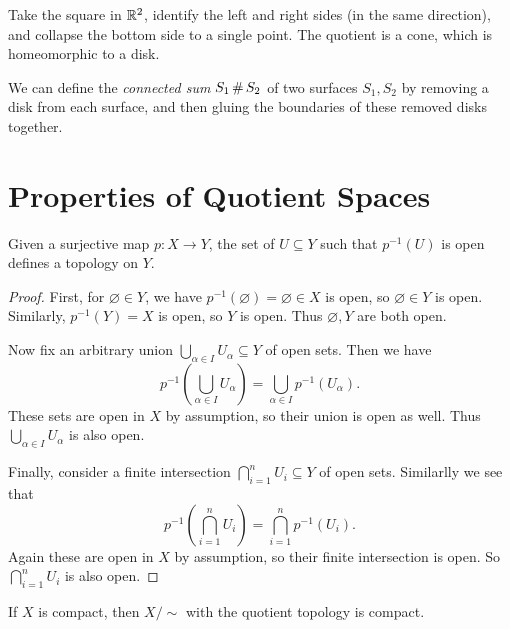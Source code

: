 \begin{example}[Cone]
  Take the square in $\mathbb{R}^2$, identify the left
  and right sides (in the same direction), and
  collapse the bottom side to a single point.
  The quotient is a cone, which is homeomorphic
  to a disk.
\end{example}

\begin{remark}
  We can define the \emph{connected sum} $S_1 \operatorname{\#} S_2$ of
  two surfaces $S_1, S_2$ by
  removing a disk from each surface, and then
  gluing the boundaries of these removed disks
  together.
\end{remark}

\section{Properties of Quotient Spaces}

\begin{theorem}
  Given a surjective map $p : X \to Y$,
  the set of $U \subseteq Y$ such that
  $p^{-1}(U)$ is open defines a topology on $Y$.
\end{theorem}

\begin{proof}
  First, for $\varnothing \in Y$, we have
  $p^{-1}(\varnothing) = \varnothing \in X$ is open,
  so $\varnothing \in Y$ is open. Similarly,
  $p^{-1}(Y) = X$ is open, so $Y$ is open.
  Thus $\varnothing, Y$ are both open.

  Now fix an arbitrary union $\bigcup_{\alpha \in I} U_{\alpha} \subseteq Y$ of open sets.
  Then we have
  \[
    p^{-1}\left(\bigcup_{\alpha \in I} U_{\alpha}\right)
    = \bigcup_{\alpha \in I} p^{-1}(U_{\alpha}).
  \]
  These sets are open in $X$ by assumption, so their
  union is open as well. Thus
  $\bigcup_{\alpha \in I} U_{\alpha}$ is also open.

  Finally, consider a finite intersection
  $\bigcap_{i = 1}^n U_i \subseteq Y$ of open sets.
  Similarlly we see that
  \[
    p^{-1}\left(\bigcap_{i = 1}^n U_i\right)
    = \bigcap_{i = 1}^n p^{-1}(U_i).
  \]
  Again these are open in $X$ by assumption, so their
  finite intersection is open. So
  $\bigcap_{i = 1}^n U_i$ is also open.
\end{proof}

\begin{corollary}
  If $X$ is compact, then $X / {\sim}$ with
  the quotient topology is compact.
\end{corollary}


